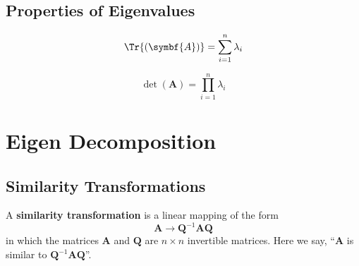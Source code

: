 \documentclass{article}
\begin{document}
\subsection{Properties of Eigenvalues}
\begin{theorem}
    \begin{equation*}
        \Tr{\left( \symbf{A} \right)} = \sum_{i=1}^n \lambda_i
    \end{equation*}
\end{theorem}
\begin{theorem}
    \begin{equation*}
        \det{\left( \symbf{A} \right)} = \prod_{i=1}^n \lambda_i
    \end{equation*}
\end{theorem}
\newpage
\section{Eigen Decomposition}
\subsection{Similarity Transformations}
\begin{definition}
    A \textbf{similarity transformation} is a linear mapping of the form
    \begin{equation*}
        \symbf{A}\rightarrow \symbf{Q}^{-1}\symbf{A}\symbf{Q}
    \end{equation*}
    in which the matrices \(\symbf{A}\) and \(\symbf{Q}\) are
    \(n \times n\) invertible matrices. Here we say, ``\(\symbf{A}\)
    is similar to \(\symbf{Q}^{-1}\symbf{A}\symbf{Q}\)''.
\end{definition}
\end{document}
